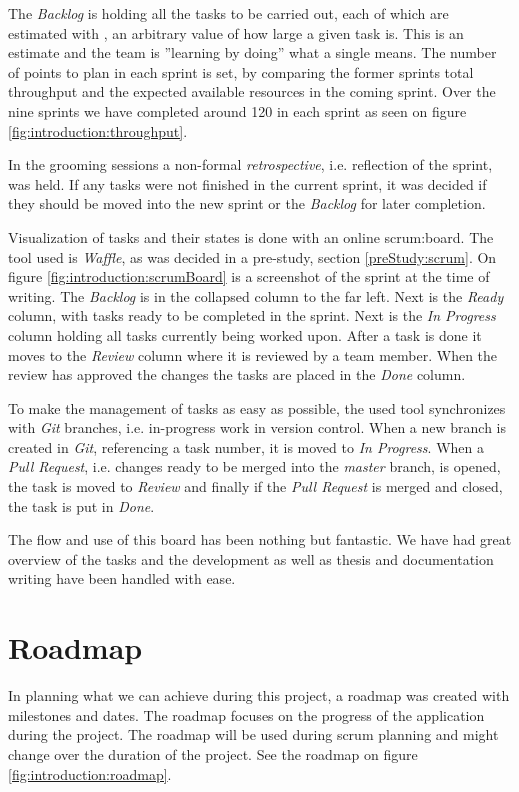 The \textit{Backlog} is holding all the tasks to be carried out, each of which are estimated with , an arbitrary value of how large a given task is.
This is an estimate and the team is ''learning by doing'' what a single  means.
The number of points to plan in each sprint is set, by comparing the former sprints total throughput and the expected available resources in the coming sprint.
Over the nine sprints we have completed around 120  in each sprint as seen on figure \ref{fig:introduction:throughput}.


In the grooming sessions a non-formal \textit{retrospective}, i.e. reflection of the sprint, was held. 
If any tasks were not finished in the current sprint, it was decided if they should be moved into the new sprint or the \textit{Backlog} for later completion.

Visualization of tasks and their states is done with an online \gls{scrum:board}.
The tool used is \textit{Waffle}, as was decided in a pre-study, section \ref{preStudy:scrum}.
On figure \ref{fig:introduction:scrumBoard} is a screenshot of the sprint at the time of writing.
The \textit{Backlog} is in the collapsed column to the far left.
Next is the \textit{Ready} column, with tasks ready to be completed in the sprint.
Next is the \textit{In Progress} column holding all tasks currently being worked upon.
After a task is done it moves to the \textit{Review} column where it is reviewed by a team member.
When the review has approved the changes the tasks are placed in the \textit{Done} column.


To make the management of tasks as easy as possible, the used tool synchronizes with \textit{Git} branches, i.e. in-progress work in version control. 
When a new branch is created in \textit{Git}, referencing a task number, it is moved to \textit{In Progress}. 
When a \textit{Pull Request}, i.e. changes ready to be merged into the \textit{master} branch, is opened, the task is moved to \textit{Review} and finally if the \textit{Pull Request} is merged and closed, the task is put in \textit{Done}.

The flow and use of this board has been nothing but fantastic.
We have had great overview of the tasks and the development as well as thesis and documentation writing have been handled with ease.

\section{Roadmap}
In planning what we can achieve during this project, a roadmap was created with milestones and dates. 
The roadmap focuses on the progress of the application during the project. 
The roadmap will be used during \gls{scrum} planning and might change over the duration of the project. 
See the roadmap on figure \ref{fig:introduction:roadmap}.

